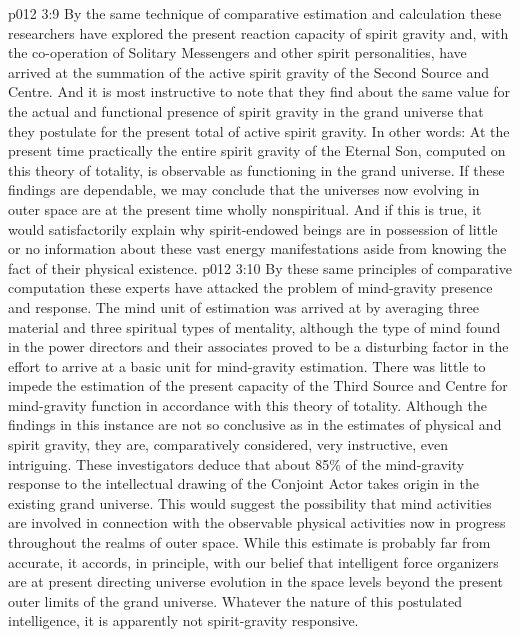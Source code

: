 \vs p012 3:9 \bibnobreakspace {} By the same technique of comparative estimation and calculation these researchers have explored the present reaction capacity of spirit gravity and, with the co\hyp{}operation of Solitary Messengers and other spirit personalities, have arrived at the summation of the active spirit gravity of the Second Source and Centre. And it is most instructive to note that they find about the same value for the actual and functional presence of spirit gravity in the grand universe that they postulate for the present total of active spirit gravity. In other words: At the present time practically the entire spirit gravity of the Eternal Son, computed on this theory of totality, is observable as functioning in the grand universe. If these findings are dependable, we may conclude that the universes now evolving in outer space are at the present time wholly nonspiritual. And if this is true, it would satisfactorily explain why spirit\hyp{}endowed beings are in possession of little or no information about these vast energy manifestations aside from knowing the fact of their physical existence.
\vs p012 3:10 \bibnobreakspace {} By these same principles of comparative computation these experts have attacked the problem of mind\hyp{}gravity presence and response. The mind unit of estimation was arrived at by averaging three material and three spiritual types of mentality, although the type of mind found in the power directors and their associates proved to be a disturbing factor in the effort to arrive at a basic unit for mind\hyp{}gravity estimation. There was little to impede the estimation of the present capacity of the Third Source and Centre for mind\hyp{}gravity function in accordance with this theory of totality. Although the findings in this instance are not so conclusive as in the estimates of physical and spirit gravity, they are, comparatively considered, very instructive, even intriguing. These investigators deduce that about 85\% of the mind\hyp{}gravity response to the intellectual drawing of the Conjoint Actor takes origin in the existing grand universe. This would suggest the possibility that mind activities are involved in connection with the observable physical activities now in progress throughout the realms of outer space. While this estimate is probably far from accurate, it accords, in principle, with our belief that intelligent force organizers are at present directing universe evolution in the space levels beyond the present outer limits of the grand universe. Whatever the nature of this postulated intelligence, it is apparently not spirit\hyp{}gravity responsive.
